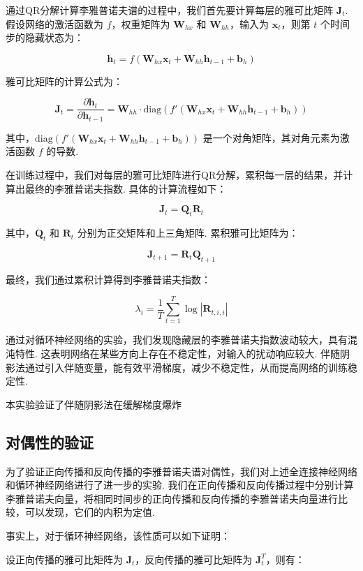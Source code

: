 通过QR分解计算李雅普诺夫谱的过程中，我们首先要计算每层的雅可比矩阵 \(\mathbf{J}_t\). 假设网络的激活函数为 \( f \)，权重矩阵为 \(\mathbf{W}_{hx}\) 和 \(\mathbf{W}_{hh}\)，输入为 \(\mathbf{x}_t\)，则第 \(t\) 个时间步的隐藏状态为：

\[
\mathbf{h}_t = f(\mathbf{W}_{hx} \mathbf{x}_t + \mathbf{W}_{hh} \mathbf{h}_{t-1} + \mathbf{b}_h)
\]

雅可比矩阵的计算公式为：

\[
\mathbf{J}_t = \frac{\partial \mathbf{h}_t}{\partial \mathbf{h}_{t-1}} = \mathbf{W}_{hh} \cdot \text{diag}(f'(\mathbf{W}_{hx} \mathbf{x}_t + \mathbf{W}_{hh} \mathbf{h}_{t-1} + \mathbf{b}_h))
\]

其中，\(\text{diag}(f'(\mathbf{W}_{hx} \mathbf{x}_t + \mathbf{W}_{hh} \mathbf{h}_{t-1} + \mathbf{b}_h))\) 是一个对角矩阵，其对角元素为激活函数 \(f\) 的导数. 

在训练过程中，我们对每层的雅可比矩阵进行QR分解，累积每一层的结果，并计算出最终的李雅普诺夫指数. 具体的计算流程如下：

\[
\mathbf{J}_t = \mathbf{Q}_t \mathbf{R}_t
\]

其中，\(\mathbf{Q}_t\) 和 \(\mathbf{R}_t\) 分别为正交矩阵和上三角矩阵. 累积雅可比矩阵为：

\[
\mathbf{J}_{t+1} = \mathbf{R}_t \mathbf{Q}_{t+1}
\]

最终，我们通过累积计算得到李雅普诺夫指数：

\[
\lambda_i = \frac{1}{T} \sum_{t=1}^T \log |\mathbf{R}_{t,i,i}|
\]

通过对循环神经网络的实验，我们发现隐藏层的李雅普诺夫指数波动较大，具有混沌特性. 这表明网络在某些方向上存在不稳定性，对输入的扰动响应较大. 伴随阴影法通过引入伴随变量，能有效平滑梯度，减少不稳定性，从而提高网络的训练稳定性. 

本实验验证了伴随阴影法在缓解梯度爆炸

\subsection{对偶性的验证}

为了验证正向传播和反向传播的李雅普诺夫谱对偶性，我们对上述全连接神经网络和循环神经网络进行了进一步的实验. 我们在正向传播和反向传播过程中分别计算李雅普诺夫向量，将相同时间步的正向传播和反向传播的李雅普诺夫向量进行比较，可以发现，它们的内积为定值. 

事实上，对于循环神经网络，该性质可以如下证明：

设正向传播的雅可比矩阵为 \(\mathbf{J}_t\)，反向传播的雅可比矩阵为 \(\mathbf{J}_t^T\)，则有：


